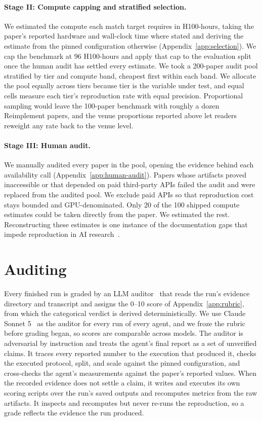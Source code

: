 \documentclass{article} %
\begin{document}
\paragraph{Stage II: Compute capping and stratified selection.} We estimated the
compute each match target requires in H100-hours, taking the paper's reported
hardware and wall-clock time where stated and deriving the estimate from the
pinned configuration otherwise (Appendix~\ref{app:selection}). We cap the
benchmark at 96 H100-hours and apply that cap to the evaluation split once the
human audit has settled every estimate. We took a 200-paper audit pool
stratified by tier and compute band, cheapest first within each band. We allocate the pool equally across
tiers because tier is the variable under test, and equal cells measure each
tier's reproduction rate with equal precision. Proportional sampling would leave the 100-paper benchmark with roughly a
dozen Reimplement papers, and the venue proportions reported above let readers reweight
any rate back to the venue level.

\paragraph{Stage III: Human audit.} We manually audited every paper in the
pool, opening the evidence behind each availability call
(Appendix~\ref{app:human-audit}). Papers whose artifacts proved
inaccessible or that depended on paid third-party APIs failed the audit and
were replaced from the audited pool. We
exclude paid APIs so that reproduction cost stays bounded and
GPU-denominated. Only 20 of
the 100 shipped compute estimates could be taken directly from the paper. We
estimated the rest. Reconstructing these
estimates is one instance of the documentation gaps that impede
reproduction in AI research~\citep{gundersen2018state,dodge2019show,henderson2020towards}.
\section{Auditing}
\label{sec:auditing}

Every finished run is graded by an LLM auditor~\citep{zheng2023judging,zhuge2025agent} that reads the
run's evidence directory and transcript and assigns the 0--10 score of
Appendix~\ref{app:rubric}, from which the categorical verdict is derived
deterministically. We use Claude Sonnet 5~\citep{anthropic2026sonnet5} as the
auditor for every run of
every agent, and we froze the rubric before grading began, so scores are
comparable across models. The auditor is
adversarial by instruction and treats the agent's final report as a set of
unverified claims. It traces every
reported number to the execution that produced it, checks the executed
protocol, split, and scale against the pinned configuration, and
cross-checks the agent's measurements against the paper's reported values.
When the recorded evidence does not settle a claim, it writes and executes
its own scoring scripts over the run's saved outputs and recomputes metrics from the raw artifacts. It inspects
and recomputes but never re-runs the reproduction, so a grade reflects the
evidence the run produced.
\end{document}
